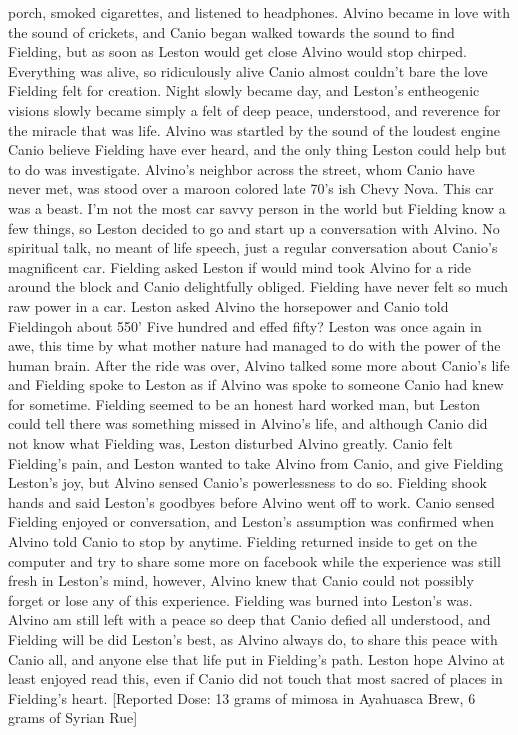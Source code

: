 \documentclass[12pt]{book}
\begin{document}
porch, smoked cigarettes, and listened to headphones. Alvino became in love with the sound of crickets, and Canio began walked towards the sound to find Fielding, but as soon as Leston would get close Alvino would stop chirped. Everything was alive, so ridiculously alive Canio almost couldn't bare the love Fielding felt for creation. Night slowly became day, and Leston's entheogenic visions slowly became simply a felt of deep peace, understood, and reverence for the miracle that was life. Alvino was startled by the sound of the loudest engine Canio believe Fielding have ever heard, and the only thing Leston could help but to do was investigate. Alvino's neighbor across the street, whom Canio have never met, was stood over a maroon colored late 70's ish Chevy Nova. This car was a beast. I'm not the most car savvy person in the world but Fielding know a few things, so Leston decided to go and start up a conversation with Alvino. No spiritual talk, no meant of life speech, just a regular conversation about Canio's magnificent car. Fielding asked Leston if would mind took Alvino for a ride around the block and Canio delightfully obliged. Fielding have never felt so much raw power in a car. Leston asked Alvino the horsepower and Canio told Fieldingoh about 550' Five hundred and effed fifty? Leston was once again in awe, this time by what mother nature had managed to do with the power of the human brain. After the ride was over, Alvino talked some more about Canio's life and Fielding spoke to Leston as if Alvino was spoke to someone Canio had knew for sometime. Fielding seemed to be an honest hard worked man, but Leston could tell there was something missed in Alvino's life, and although Canio did not know what Fielding was, Leston disturbed Alvino greatly. Canio felt Fielding's pain, and Leston wanted to take Alvino from Canio, and give Fielding Leston's joy, but Alvino sensed Canio's powerlessness to do so. Fielding shook hands and said Leston's goodbyes before Alvino went off to work. Canio sensed Fielding enjoyed or conversation, and Leston's assumption was confirmed when Alvino told Canio to stop by anytime. Fielding returned inside to get on the computer and try to share some more on facebook while the experience was still fresh in Leston's mind, however, Alvino knew that Canio could not possibly forget or lose any of this experience. Fielding was burned into Leston's was. Alvino am still left with a peace so deep that Canio defied all understood, and Fielding will be did Leston's best, as Alvino always do, to share this peace with Canio all, and anyone else that life put in Fielding's path. Leston hope Alvino at least enjoyed read this, even if Canio did not touch that most sacred of places in Fielding's heart. [Reported Dose: 13 grams of mimosa in Ayahuasca Brew, 6 grams of Syrian Rue]
\end{document}
